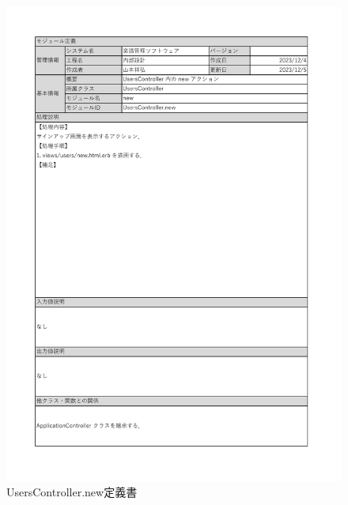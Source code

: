 \begin{figure}
    \centering
    \includegraphics[scale=0.7]{img/Users/xlsx/UsersController_new.pdf}
    \vspace{-1cm}
    \caption{UsersController.new定義書}
\end{figure}
